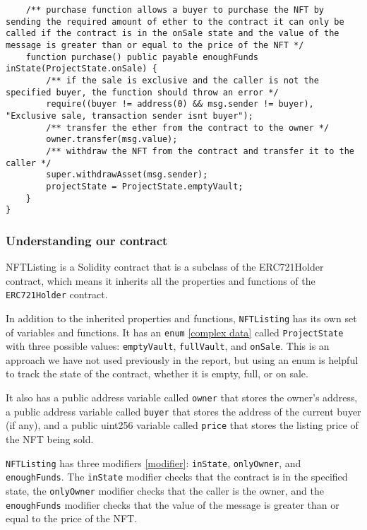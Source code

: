 \documentclass{article}
\theoremstyle{theorem}
\theoremstyle{definition}
\theoremstyle{remark}
\begin{document}
\begin{itemize}
\begin{lstlisting}
    /** purchase function allows a buyer to purchase the NFT by sending the required amount of ether to the contract it can only be called if the contract is in the onSale state and the value of the message is greater than or equal to the price of the NFT */
    function purchase() public payable enoughFunds inState(ProjectState.onSale) {
        /** if the sale is exclusive and the caller is not the specified buyer, the function should throw an error */
        require((buyer != address(0) && msg.sender != buyer), "Exclusive sale, transaction sender isnt buyer");    
        /** transfer the ether from the contract to the owner */
        owner.transfer(msg.value);
        /** withdraw the NFT from the contract and transfer it to the caller */
        super.withdrawAsset(msg.sender);
        projectState = ProjectState.emptyVault;
    }
}
\end{lstlisting}
\end{itemize}

\subsubsection{Understanding our contract} 

\medskip\noindent
\colorbox{Gainsboro!60!Lavender}{NFTListing} is a Solidity contract that is a subclass of the \colorbox{Gainsboro!60!Lavender}{ERC721Holder} contract, which means it inherits all the properties and functions of the \texttt{ERC721Holder} contract.

\medskip\noindent
In addition to the inherited properties and functions, \texttt{NFTListing} has its own set of variables and functions. It has an \texttt{enum} \ref{complex data} called \texttt{ProjectState} with three possible values: \texttt{emptyVault}, \texttt{fullVault}, and \texttt{onSale}. This is an approach we have not used previously in the report, but using an enum is helpful to track the state of the contract, whether it is empty, full, or on sale.

\medskip\noindent
It also has a public address variable called \texttt{owner} that stores the owner's address, a public address variable called \texttt{buyer} that stores the address of the current buyer (if any), and a public uint256 variable called \texttt{price} that stores the listing price of the NFT being sold.

\medskip\noindent
\texttt{NFTListing} has three modifiers \ref{modifier}: \texttt{inState}, \texttt{onlyOwner}, and \texttt{enoughFunds}. The \texttt{inState} modifier checks that the contract is in the specified state, the \texttt{onlyOwner} modifier checks that the caller is the owner, and the \texttt{enoughFunds} modifier checks that the value of the message is greater than or equal to the price of the NFT.
\end{document}
